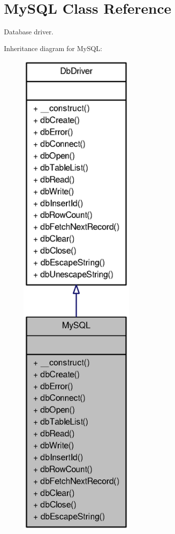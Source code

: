 \section{MySQL Class Reference}
\label{classMySQL}


Database driver.  




Inheritance diagram for MySQL:\nopagebreak
\begin{figure}[H]
\begin{center}
\leavevmode
\includegraphics[width=162pt]{classMySQL__inherit__graph}
\end{center}
\end{figure}


